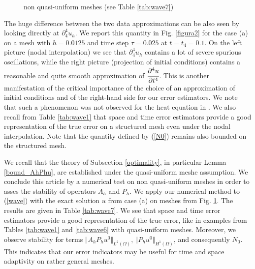 \documentclass{imanum}
\begin{document}
\begin{figure}[h]
\noindent{}
\caption{non quasi-uniform meshes (see Table \ref{tab:wave7})}
\label{figura3}
\end{figure}

  The huge difference between the two data approximations can be also seen by looking directly at ${\partial}^4_4 u_h$. We report this quantity in  Fig. \ref{figura2}  for the case (a) on a mesh with $h=0.0125$ and time step $\tau=0.025$ at $t=t_4=0.1$. On the left picture (nodal interpolation) we see that ${\partial}^4_4 u_h$ contains a lot of severe spurious oscillations, while the right picture (projection of initial conditions) contains a reasonable and quite smooth approximation of $\cfrac{\partial^4 u}{\partial t^4}$. This is another manifestation of the critical importance of the choice of an approximation of initial conditions and of the right-hand side for our error estimators. We note that such a phenomenon was not observed for the heat equation in \cite{LPP}. We also recall from Table \ref{tab:wave1} that space and time error estimators provide a good representation of the true error on a structured mesh even under the nodal interpolation. Note that the quantity defined by (\ref{N0}) remains also bounded on the structured mesh. 


We recall that the theory of Subsection \ref{optimality}, in particular Lemma \ref{bound_AhPhu}, are established under the quasi-uniform meshe assumption. We conclude this article by a numerical test on non quasi-uniform meshes in order to asses the stability of operators $A_h$ and $P_h$. We apply our numerical method to (\ref{wave}) with the exact solution $u$ from case (a) on meshes from  Fig. \ref{figura3}. The results are given in Table \ref{tab:wave7}.  We see that space and time error estimators provide a good representation of the true error, like in examples from Tables \ref{tab:wave1} and \ref{tab:wave6} with quasi-uniform meshes. Moreover, we observe stability for terms $\Vert A_hP_hu^0\Vert_{L^2(\Omega)}$, $\Vert P_hu^0\Vert_{H^1(\Omega)}$, and consequently $N_0$. This indicates that our error indicators may be useful for time and space adaptivity on rather general meshes.
\end{document}
